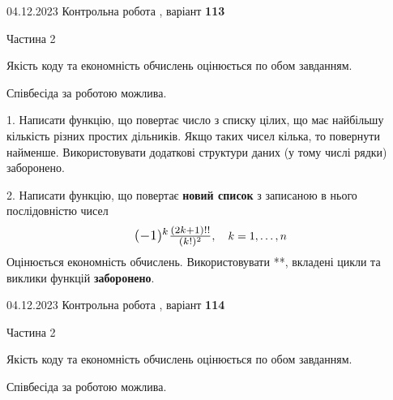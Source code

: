\documentclass[12pt, ukrainian]{article}
\begin{document}
{{{{{{{{{{{{%



\begin {Huge}
{{04.12.2023 Контрольна робота , варіант  \No \textbf { 113 }\par}}

\begin{center}Частина 2
\end{center}
\vspace{10mm}
\end {Huge}

{
\begin {Large}
Якість коду та економність обчислень оцінюється по обом завданням.

Співбесіда за роботою можлива.

\vspace{5mm}

1. Написати функцію, що повертає число з списку цілих, що має найбільшу кількість різних простих дільників. Якщо таких чисел кілька, то повернути найменше. Використовувати додаткові структури даних (у тому числі рядки) заборонено.

\vspace{10mm}



2. 
Написати функцію, що повертає \textbf{новий список} з записаною в нього послідовністю чисел
$$\scalebox{1.2}{$(-1)^{k}\frac{(2k+1)!!}{(k!)^2}$}, \quad k=1,\ldots,n$$
Оцінюється економність обчислень. Використовувати **, вкладені цикли та виклики функцій \textbf{заборонено}.

\end{Large}\newpage




\begin {Huge}
{{04.12.2023 Контрольна робота , варіант  \No \textbf { 114 }\par}}

\begin{center}Частина 2
\end{center}
\vspace{10mm}
\end {Huge}

{
\begin {Large}
Якість коду та економність обчислень оцінюється по обом завданням.

Співбесіда за роботою можлива.

\vspace{5mm}


\end{Large}}}}}}}}}}}}}}}
\end{document}
